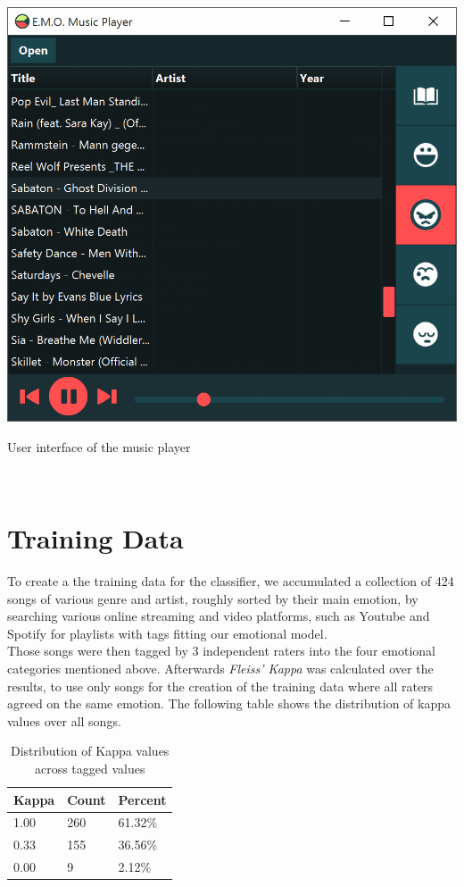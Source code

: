 \documentclass{sigchi-ext}
\begin{document}
\begin{marginfigure}[0pc]
  \begin{minipage}{\marginparwidth}
    \centering
    \includegraphics[width=1.0\marginparwidth]{images/screenshot.png}
  	\caption{User interface of the music player}~\label{fig:screenshot}
  \end{minipage}
\end{marginfigure}

\section{Training Data}\label{training-data}
To create a the training data for the classifier, we accumulated a collection of 424 songs of various genre and artist, roughly sorted by their main emotion, by searching various online streaming and video platforms, such as Youtube and Spotify for playlists with tags fitting our emotional model.\\
Those songs were then tagged by 3 independent raters into the four emotional categories mentioned above. Afterwards \textit{Fleiss' Kappa} was calculated over the results, to use only songs for the creation of the training data where all raters agreed on the same emotion. The following table shows the distribution of kappa values over all songs.\\

\begin{table}
  \centering
  \label{kappa-distribution}
  \begin{tabular}{@{}lll@{}}
    Kappa & Count & Percent \\ \midrule
    1.00 & 260 & 61.32\% \\
    0.33 & 155 & 36.56\% \\
    0.00 & 9 	 & 2.12\%
  \end{tabular}
  \caption{Distribution of Kappa values across tagged values}
\end{table}
\end{document}
